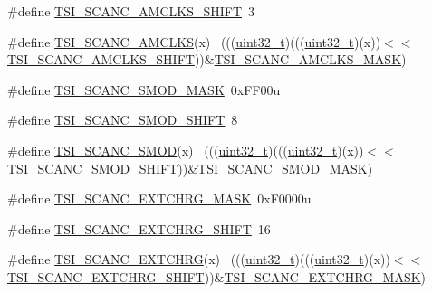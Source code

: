 \begin{DoxyCompactItemize}
\item 
\#define \hyperlink{group___t_s_i___register___masks_ga4800a19f7603462d1b6ba211b9cb8b5f}{T\+S\+I\+\_\+\+S\+C\+A\+N\+C\+\_\+\+A\+M\+C\+L\+K\+S\+\_\+\+S\+H\+I\+FT}~3
\item 
\#define \hyperlink{group___t_s_i___register___masks_ga3cf9761f62c8570d4d82d8752df90e96}{T\+S\+I\+\_\+\+S\+C\+A\+N\+C\+\_\+\+A\+M\+C\+L\+KS}(x)                                        ~(((\hyperlink{_p_e___types_8h_a33594304e786b158f3fb30289278f5af}{uint32\+\_\+t})(((\hyperlink{_p_e___types_8h_a33594304e786b158f3fb30289278f5af}{uint32\+\_\+t})(x))$<$$<$\hyperlink{group___t_s_i___register___masks_ga4800a19f7603462d1b6ba211b9cb8b5f}{T\+S\+I\+\_\+\+S\+C\+A\+N\+C\+\_\+\+A\+M\+C\+L\+K\+S\+\_\+\+S\+H\+I\+FT}))\&\hyperlink{group___t_s_i___register___masks_ga020a126e5eafeff150a1b960bc17679f}{T\+S\+I\+\_\+\+S\+C\+A\+N\+C\+\_\+\+A\+M\+C\+L\+K\+S\+\_\+\+M\+A\+SK})
\item 
\#define \hyperlink{group___t_s_i___register___masks_gabe47ab9c65156f2c6cb9389b96c36843}{T\+S\+I\+\_\+\+S\+C\+A\+N\+C\+\_\+\+S\+M\+O\+D\+\_\+\+M\+A\+SK}~0x\+F\+F00u
\item 
\#define \hyperlink{group___t_s_i___register___masks_gaea5084730b6e76063397e67f558ab423}{T\+S\+I\+\_\+\+S\+C\+A\+N\+C\+\_\+\+S\+M\+O\+D\+\_\+\+S\+H\+I\+FT}~8
\item 
\#define \hyperlink{group___t_s_i___register___masks_gac2872c89d4a12afb8e253c30657386f2}{T\+S\+I\+\_\+\+S\+C\+A\+N\+C\+\_\+\+S\+M\+OD}(x)                                            ~(((\hyperlink{_p_e___types_8h_a33594304e786b158f3fb30289278f5af}{uint32\+\_\+t})(((\hyperlink{_p_e___types_8h_a33594304e786b158f3fb30289278f5af}{uint32\+\_\+t})(x))$<$$<$\hyperlink{group___t_s_i___register___masks_gaea5084730b6e76063397e67f558ab423}{T\+S\+I\+\_\+\+S\+C\+A\+N\+C\+\_\+\+S\+M\+O\+D\+\_\+\+S\+H\+I\+FT}))\&\hyperlink{group___t_s_i___register___masks_gabe47ab9c65156f2c6cb9389b96c36843}{T\+S\+I\+\_\+\+S\+C\+A\+N\+C\+\_\+\+S\+M\+O\+D\+\_\+\+M\+A\+SK})
\item 
\#define \hyperlink{group___t_s_i___register___masks_gab5798996c8488e915c2db48de5f5d0bb}{T\+S\+I\+\_\+\+S\+C\+A\+N\+C\+\_\+\+E\+X\+T\+C\+H\+R\+G\+\_\+\+M\+A\+SK}~0x\+F0000u
\item 
\#define \hyperlink{group___t_s_i___register___masks_ga5381f1f7b0d3256890453050ef35486d}{T\+S\+I\+\_\+\+S\+C\+A\+N\+C\+\_\+\+E\+X\+T\+C\+H\+R\+G\+\_\+\+S\+H\+I\+FT}~16
\item 
\#define \hyperlink{group___t_s_i___register___masks_ga95fe823ddb5a6450bff2885fba98d5b3}{T\+S\+I\+\_\+\+S\+C\+A\+N\+C\+\_\+\+E\+X\+T\+C\+H\+RG}(x)                                      ~(((\hyperlink{_p_e___types_8h_a33594304e786b158f3fb30289278f5af}{uint32\+\_\+t})(((\hyperlink{_p_e___types_8h_a33594304e786b158f3fb30289278f5af}{uint32\+\_\+t})(x))$<$$<$\hyperlink{group___t_s_i___register___masks_ga5381f1f7b0d3256890453050ef35486d}{T\+S\+I\+\_\+\+S\+C\+A\+N\+C\+\_\+\+E\+X\+T\+C\+H\+R\+G\+\_\+\+S\+H\+I\+FT}))\&\hyperlink{group___t_s_i___register___masks_gab5798996c8488e915c2db48de5f5d0bb}{T\+S\+I\+\_\+\+S\+C\+A\+N\+C\+\_\+\+E\+X\+T\+C\+H\+R\+G\+\_\+\+M\+A\+SK})
$$
\end{DoxyCompactItemize}
